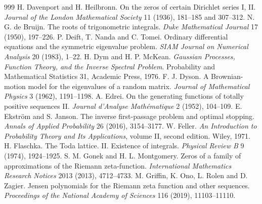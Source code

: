 \begin{thebibliography}{999}
 H. Davenport and H. Heilbronn. On the zeros of certain Dirichlet series I, II. \emph{Journal of the London Mathematical Society} 11 (1936), 181--185 and 307--312.
 N. G. de Bruijn. The roots of trigonometric integrals. \emph{Duke Mathematical Journal} 17 (1950), 197--226.
 P. Deift, T. Nanda and C. Tomei. Ordinary differential equations and the symmetric eigenvalue problem. \emph{SIAM Journal on Numerical Analysis} 20 (1983), 1--22.
 H. Dym and H. P. McKean. \emph{Gaussian Processes, Function Theory, and the Inverse Spectral Problem}. Probability and Mathematical Statistics 31, Academic Press, 1976.
 F. J. Dyson. A Brownian-motion model for the eigenvalues of a random matrix. \emph{Journal of Mathematical Physics} 3 (1962), 1191--1198.
 A. Edrei. On the generating functions of totally positive sequences II. \emph{Journal d'Analyse Math\'ematique} 2 (1952), 104--109.
 E. Ekstr\"om and S. Janson. The inverse first-passage problem and optimal stopping. \emph{Annals of Applied Probability} 26 (2016), 3154--3177.
 W. Feller. \emph{An Introduction to Probability Theory and Its Applications}, volume II, second edition. Wiley, 1971.
 H. Flaschka. The Toda lattice. II. Existence of integrals. \emph{Physical Review B} 9 (1974), 1924--1925.
 S. M. Gonek and H. L. Montgomery. Zeros of a family of approximations of the Riemann zeta-function. \emph{International Mathematics Research Notices} 2013 (2013), 4712--4733.
 M. Griffin, K. Ono, L. Rolen and D. Zagier. Jensen polynomials for the Riemann zeta function and other sequences. \emph{Proceedings of the National Academy of Sciences} 116 (2019), 11103--11110.

\end{thebibliography}
